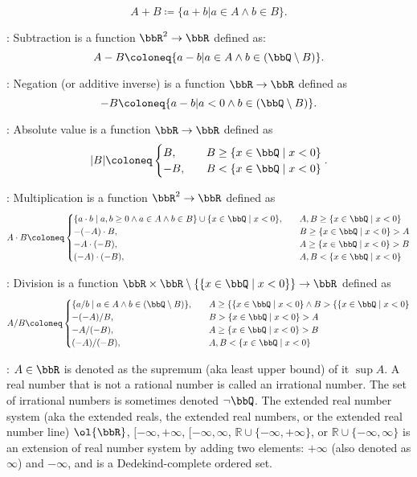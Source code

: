 \documentclass[a4paper,12pt]{report}
\begin{document}
\begin{itemizle}
\[A+B\coloneq\{a+b|a\in A\land b\in B\}.\]
\item {}: Subtraction is a function $\bbR^2\to\bbR$ defined as:
\[A-B\coloneq\{a-b|a\in A\land b\in(\bbQ\setminus B)\}.\]
\item {}: Negation (or additive inverse) is a function $\bbR\to\bbR$ defined as
\[-B\coloneq\{a-b|a<0\land b\in(\bbQ\setminus B)\}.\]
\item {}: Absolute value is a function $\bbR\to\bbR$ defined as
\[|B|\coloneq\begin{cases}
B,\quad&B\geq\{x\in\bbQ\mid x<0\}\\
-B,\quad&B<\{x\in\bbQ\mid x<0\}
\end{cases}.\]
\item {}: Multiplication is a function $\bbR^2\to\bbR$ defined as
\[A\cdot B\coloneq\begin{cases}
\{a\cdot b\mid a,b\geq 0\land a\in A\land b\in B\}\cup\{x\in\bbQ\mid x<0\},\quad&A,B\geq\{x\in\bbQ\mid x<0\}\\
-(-A)\cdot B,\quad&B\geq\{x\in\bbQ\mid x<0\}>A\\
-A\cdot (-B),\quad&A\geq\{x\in\bbQ\mid x<0\}>B\\
(-A)\cdot (-B),\quad&A,B<\{x\in\bbQ\mid x<0\}
\end{cases}\]
\item {}: Division is a function $\bbR\times\bbR\setminus\{\{x\in\bbQ\mid x<0\}\}\to\bbR$ defined as
\[A/B\coloneq\begin{cases}
\{a/b\mid a\in A\land b\in(\bbQ\setminus B)\},\quad&A\geq\{\{x\in\bbQ\mid x<0\}\land B>\{\{x\in\bbQ\mid x<0\}\\
-(-A)/B,\quad&B>\{x\in\bbQ\mid x<0\}>A\\
-A/(-B),\quad&A\geq\{x\in\bbQ\mid x<0\}>B\\
(-A)/(-B),\quad&A,B<\{x\in\bbQ\mid x<0\}
\end{cases}\]
\item {}: $A\in\bbR$ is denoted as the supremum (aka least upper bound) of it $\sup A$.
\eit
{}
A real number that is not a rational number is called an irrational number. The set of irrational numbers is sometimes denoted $\neg\bbQ$.
The extended real number system (aka the extended reals, the extended real numbers, or the extended real number line) $\ol{\bbR}$, $[-\infty,+\infty$, $[-\infty,\infty$, $\mathbb{R}\cup\{-\infty,+\infty\}$, or $\mathbb{R}\cup\{-\infty,\infty\}$ is an extension of real number system by adding two elements: $+\infty$ (also denoted as $\infty$) and $-\infty$, and is a Dedekind-complete ordered set.

\end{itemizle}
\end{document}
